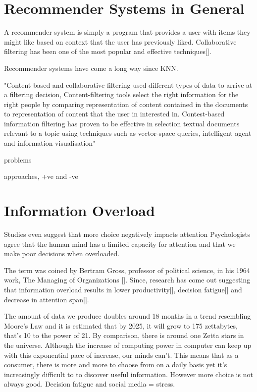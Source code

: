 \section{Recommender Systems in General}
A recommender system is simply a program that provides a user with items they might like based on context that the user has previously liked. Collaborative filtering has been one of the most popular and effective techniques[]. 

Recommender systems have come a long way since KNN. 

"Content-based and collaborative filtering used different types of data to arrive at a filtering decision, Content-filtering tools select the right information for the right people by comparing representation of content contained in the documents to representation of content that the user in interested in. Contest-based information filtering has proven to be effective in selection textual documents relevant to a topic using techniques such as vector-space queries, intelligent agent and information visualisation"

problems

approaches, 
+ve and -ve

\section{Information Overload}
Studies even suggest that more choice negatively impacts attention \cite{attention}
Psychologists agree that the human mind has a limited capacity for attention and that we make poor decisions when overloaded.

The term was coined by Bertram Gross, professor of political science, in his 1964 work, The Managing of Organizations []. Since,  research has come out suggesting that information overload results in lower productivity[], decision fatigue[] and decrease in attention span[]. 


The amount of data we produce doubles around 18 months in a trend resembling Moore's Law and it is estimated that by 2025, it will grow to 175 zettabytes, that's 10 to the power of 21. By comparison, there is around one Zetta stars in the universe. Although the increase of computing power in computer can keep up with this exponential pace of increase, our minds can't. This means that as a consumer, there is more and more to choose from on a daily basis yet it's increasingly difficult to to discover useful information. 
However more choice is not always good. Decision fatigue and social media = stress. 

